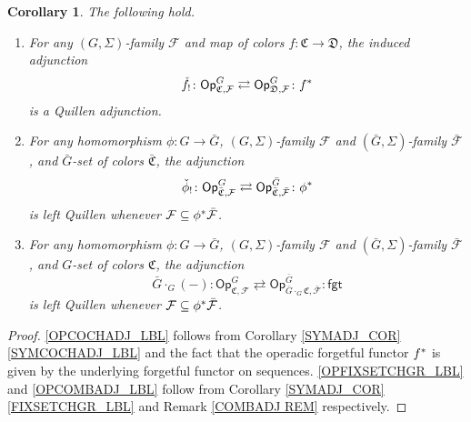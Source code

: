 \documentclass[a4paper,10pt
,draft
]{article}%
\numberwithin{equation}{section}
\numberwithin{figure}{section}
\newtheorem{corollary}[equation]{Corollary}%
\theoremstyle{definition} %
\newtheorem{remark}[equation]{Remark}%
\newcommand{\F}{\ensuremath{\mathcal F}}
\newcommand{\1}{\ensuremath{\mathbbm 1}}%
\begin{document}
\begin{corollary}
      \label{OPADJ_COR}
      The following hold.
      \begin{enumerate}[label=(\roman*)]
      \item \label{OPCOCHADJ_LBL}
            For any $(G,\Sigma)$-family $\F$ and map of colors $f \colon \mathfrak C \to \mathfrak D$, the induced adjunction
            \[
                  \check{f}_! \colon \mathsf{Op}^G_{\mathfrak{C},\F}
                  \rightleftarrows
                  \mathsf{Op}^G_{\mathfrak{D},\F} \colon f^{\**}
            \]
            is a Quillen adjunction.
      \item \label{OPFIXSETCHGR_LBL}
            For any homomorphism $\phi \colon G \to \bar G$,
            $(G,\Sigma)$-family $\F$ and $(\bar G,\Sigma)$-family $\bar{\F}$,
            and $\bar G$-set of colors $\bar{\mathfrak C}$,
            the adjunction
            \[
                  \check{\phi}_! \colon \mathsf{Op}^G_{\bar{\mathfrak{C}},\F}
                  \rightleftarrows
                  \mathsf{Op}^{\bar{G}}_{\bar{\mathfrak{C}},\bar{\F}} \colon \phi^{\**}
            \]
            is left Quillen whenever $\F \subseteq \phi^{\**} \bar{\F}$.
      \item \label{OPCOMBADJ_LBL}
            For any homomorphism $\phi \colon G \to \bar G$,
            $(G,\Sigma)$-family $\F$ and $(\bar G,\Sigma)$-family $\bar{\F}$,
            and $G$-set of colors $\mathfrak C$,
            the adjunction
            \[
                  \bar{G} \cdot_G (-) \colon \mathsf{Op}^G_{\mathfrak{C},\F}
                  \rightleftarrows
                  \mathsf{Op}^{\bar{G}}_{\bar{G} \cdot_G \mathfrak{C},\bar{\F}} \colon \mathsf{fgt}
            \]
            is left Quillen whenever $\F \subseteq \phi^{\**} \bar{\F}$.
      \end{enumerate}
\end{corollary}
\begin{proof}
      \ref{OPCOCHADJ_LBL} follows from Corollary \ref{SYMADJ_COR}\ref{SYMCOCHADJ_LBL} and the fact that
      the operadic forgetful functor $f^{\**}$ is given by the underlying forgetful functor on sequences.
      \ref{OPFIXSETCHGR_LBL} and \ref{OPCOMBADJ_LBL} follow from
      Corollary \ref{SYMADJ_COR}\ref{FIXSETCHGR_LBL} and Remark \ref{COMBADJ REM} respectively.      
\end{proof}

\end{document}
